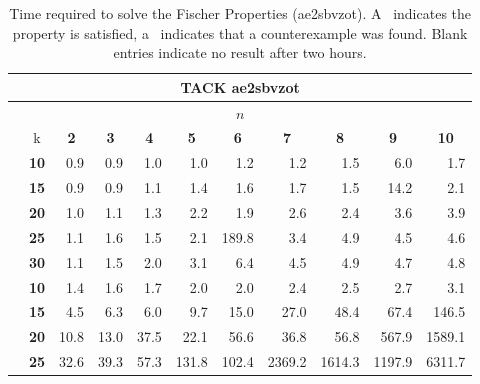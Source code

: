 \documentclass[a4paper,11pt]{report}
\newcommand*\cmark{\small\Checkmark}
\newcommand*{\xmark}{\small\XSolidBrush}
\theoremstyle{definition}
\newcommand{\aez}{ae2sbvzot}
\begin{document}
\begin{table}
\footnotesize
{}
\centering
\caption[Time required to solve the Fischer Properties (\aez)]{Time required to solve the Fischer Properties (\aez). A \cmark\
  indicates the property is satisfied, a \xmark\ indicates that a counterexample
  was found. Blank entries indicate no result after two hours.}
\label{table:fischer-results-aez}
\begin{tabular}{c c r r r r r r r r r}
\toprule
\multicolumn{11}{c}{TACK ae2sbvzot} \\
\midrule
\multicolumn{11}{c}{\(n\)} \\
\midrule
& k & \multicolumn{1}{c}{\textbf{2}} & \multicolumn{1}{c}{\textbf{3}} & \multicolumn{1}{c}{\textbf{4}} & \multicolumn{1}{c}{\textbf{5}} & \multicolumn{1}{c}{\textbf{6}} & \multicolumn{1}{c}{\textbf{7}} & \multicolumn{1}{c}{\textbf{8}} & \multicolumn{1}{c}{\textbf{9}} & \multicolumn{1}{c}{\textbf{10}} \\
\midrule
\multirow{5}{1em}{\rotatebox{90}{\textbf{live-one\ }}}
& \textbf{10} & 0.9\cmark & 0.9\cmark & 1.0\cmark & 1.0\cmark & 1.2\cmark & 1.2\cmark & 1.5\cmark & 6.0\cmark & 1.7\cmark \\
& \textbf{15} & 0.9\cmark & 0.9\cmark & 1.1\cmark & 1.4\cmark & 1.6\cmark & 1.7\cmark & 1.5\cmark & 14.2\cmark & 2.1\cmark \\
& \textbf{20} & 1.0\cmark & 1.1\cmark & 1.3\cmark & 2.2\cmark & 1.9\cmark & 2.6\cmark & 2.4\cmark & 3.6\cmark & 3.9\cmark \\
& \textbf{25} & 1.1\cmark & 1.6\cmark & 1.5\cmark & 2.1\cmark & 189.8\cmark & 3.4\cmark & 4.9\cmark & 4.5\cmark & 4.6\cmark \\
& \textbf{30} & 1.1\cmark & 1.5\cmark & 2.0\cmark & 3.1\cmark & 6.4\cmark & 4.5\cmark & 4.9\cmark & 4.7\cmark & 4.8\cmark \\
\midrule
\multirow{5}{1em}{\rotatebox{90}{\textbf{live-two\ }}}
& \textbf{10} & 1.4\cmark & 1.6\cmark & 1.7\cmark & 2.0\cmark & 2.0\cmark & 2.4\cmark & 2.5\cmark & 2.7\cmark & 3.1\cmark \\
& \textbf{15} & 4.5\cmark & 6.3\cmark & 6.0\cmark & 9.7\cmark & 15.0\cmark & 27.0\cmark & 48.4\cmark & 67.4\cmark & 146.5\cmark \\
& \textbf{20} & 10.8\cmark & 13.0\cmark & 37.5\cmark & 22.1\cmark & 56.6\cmark & 36.8\cmark & 56.8\cmark & 567.9\cmark & 1589.1\cmark \\
& \textbf{25} & 32.6\cmark & 39.3\cmark & 57.3\cmark & 131.8\cmark & 102.4\cmark & 2369.2\cmark & 1614.3\cmark & 1197.9\cmark & 6311.7\cmark \\

\end{tabular}
\end{table}
\end{document}
